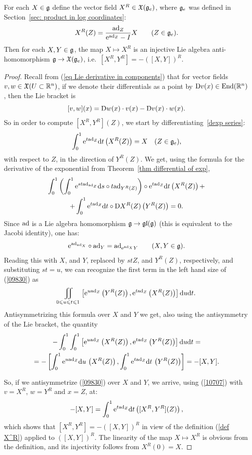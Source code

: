 \begin{lem}[{{\cite[Lem.~1.8.2]{DK}}}]
    For each $X\in\mathfrak{g}$ define the vector field $X^R\in \mathfrak{X}(\mathfrak{g}_e)$, where $\mathfrak{g}_e$ was defined in Section~\ref{sec: product in log coordinates}:
    \[ X^R(Z)=\frac{\mathrm{ad}_Z}{\mathrm{e}^{\mathrm{ad}_Z}-I}X\quad \quad (Z\in\mathfrak{g}_e). \label{def X^R}\]
    Then for each $X,Y\in\mathfrak{g}$, the map $X\mapsto X^R$ is an injective Lie algebra anti-homomorphism $\mathfrak{g}\to \mathfrak{X}(\mathfrak{g}_e)$, i.e.\ $[X^R,Y^R]=-([X,Y])^R$.
\end{lem}
\begin{proof}
    Recall from (\ref{eq Lie derivative in components}) that for vector fields $v,w\in\mathfrak{X}(U\subset\mathbb{R}^n)$, if we denote their differentials as a point by $\mathrm{D} v(x)\in \operatorname{End}(\mathbb{R}^n)$, then the Lie bracket is
    \[[v,w](x)=\mathrm{D} w(x)\cdot v(x)-\mathrm{D} v(x)\cdot w(x).\label{10707}\]
    So in order to compute $[X^R,Y^R](Z)$, we start by differentiating~\ref{dexp series}:
    \[\int_0^1 \mathrm{e}^{t\mathrm{ad}_Z}{\mathrm{d}} t \left(X^R(Z)\right)=X\quad (Z\in\mathfrak{g}_e),\]
    with respect to $Z$, in the direction of $Y^R(Z)$. We get, using the formula for the derivative of the exponential from Theorem~\ref{thm differential of exp}, 
    \begin{multline}
        \int_0^1 \left(\int_0^1\mathrm{e}^{st\mathrm{ad}_{\mathrm{ad}_Z}} {\mathrm{d}} s\circ t\mathrm{ad}_{Y^R(Z)}\right)\circ \mathrm{e}^{t\mathrm{ad}_Z}{\mathrm{d}} t\left(X^R(Z)\right)+\\
        +\int_0^1\mathrm{e}^{t\mathrm{ad}_Z}{\mathrm{d}} t\circ \mathrm{D} X^R(Z)\left(Y^R(Z)\right)=0.\label{09830}
    \end{multline} 
    Since $\mathrm{ad}$ is a Lie algebra homomorphism $\mathfrak{g}\to\mathfrak{gl}(\mathfrak{g})$ (this is equivalent to the Jacobi identity), one has:
    \[\mathrm{e}^{\mathrm{ad}_{\mathrm{ad}_X}}\circ \mathrm{ad}_Y=\mathrm{ad}_{\mathrm{e}^{\mathrm{ad}_X} Y}\quad \quad (X,Y\in\mathfrak{g}).\]
    Reading this with $X$, and $Y$, replaced by $stZ$, and $Y^R(Z)$, respectively, and substituting $st=u$, we can recognize the first term in the left hand size of (\ref{09830}) as
    \[\iint_{0\leqslant u\leqslant t\leqslant 1}\left[\mathrm{e}^{u\mathrm{ad}_Z}\left(Y^R(Z)\right),\mathrm{e}^{t\mathrm{ad}_Z}\left(X^R(Z)\right)\right]{\mathrm{d}} u{\mathrm{d}} t.\]
    Antisymmetrizing this formula over $X$ and $Y$  we get, also using the antisymmetry of the Lie bracket, the quantity
    \begin{multline}
        -\int_0^1\int_0^1\left[\mathrm{e}^{u\mathrm{ad}_Z}\left(X^R(Z)\right),\mathrm{e}^{t\mathrm{ad}_Z}\left(Y^R(Z)\right)\right]{\mathrm{d}} u{\mathrm{d}} t=\\
        =-\left[\int_0^1\mathrm{e}^{u\mathrm{ad}_Z}{\mathrm{d}} u\, \left(X^R(Z)\right),\int_0^1\mathrm{e}^{t\mathrm{ad}_Z}{\mathrm{d}} t\, \left(Y^R(Z)\right)\right]=-[X,Y].
    \end{multline}

    So, if we antisymmetrize (\ref{09830}) over $X$ and $Y$, we arrive, using (\ref{10707}) with $v=X^R$, $w=Y^R$ and $x=Z$, at:
    \[-[X,Y]=\int_0^1 \mathrm{e}^{t\mathrm{ad}_Z}{\mathrm{d}} t\left([X^R,Y^R](Z)\right),\]
    which shows that $[X^R,Y^R]=-([X,Y])^R$ in view of the definition (\ref{def X^R}) applied to $([X,Y])^R$. The linearity of the map $X\mapsto X^R$ is obvious from the definition, and its injectivity follows from $X^R(0)=X$.
\end{proof}
